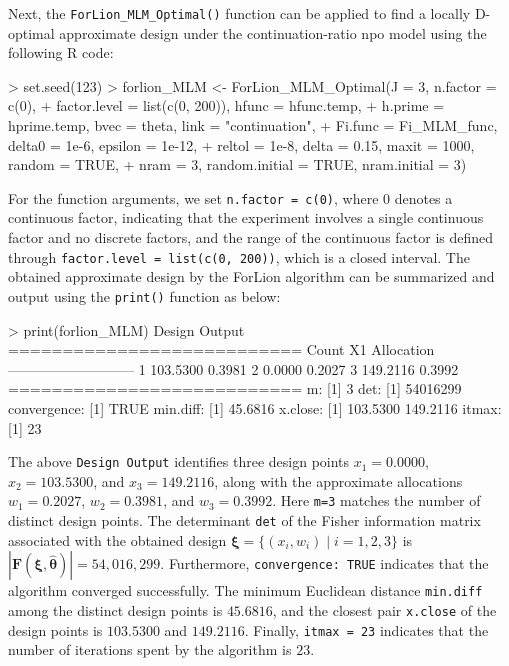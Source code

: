 Next, the \verb|ForLion_MLM_Optimal()| function can be applied to find a locally D-optimal approximate design under the continuation-ratio npo model using the following R code:
\begin{example}
> set.seed(123)
> forlion_MLM <- ForLion_MLM_Optimal(J = 3, n.factor = c(0),
+                factor.level = list(c(0, 200)), hfunc = hfunc.temp, 
+                h.prime = hprime.temp, bvec = theta, link = "continuation", 
+                Fi.func = Fi_MLM_func, delta0 = 1e-6, epsilon = 1e-12, 
+                reltol = 1e-8, delta = 0.15, maxit = 1000, random = TRUE, 
+                nram = 3, random.initial = TRUE, nram.initial = 3)
\end{example}

For the function arguments, we set \verb|n.factor = c(0)|, where 0 denotes a continuous factor, indicating that the experiment involves a single continuous factor and no discrete factors, and the range of the continuous factor is defined through \texttt{factor.level = list(c(0, 200))}, which is a closed interval. The obtained approximate design by the ForLion algorithm can be summarized and output using the \verb|print()| function as below:
\begin{example}
> print(forlion_MLM)
Design Output
=========================== 
Count  X1        Allocation
--------------------------- 
1      103.5300  0.3981
2        0.0000  0.2027
3      149.2116  0.3992
=========================== 
m:
[1] 3
det:
[1] 54016299
convergence:
[1] TRUE
min.diff:
[1] 45.6816
x.close:
[1] 103.5300 149.2116
itmax:
[1] 23
\end{example}

The above \verb|Design Output| identifies three design points $x_1 = 0.0000$, $x_2 = 103.5300$, and $x_3 = 149.2116$, along with the approximate allocations  $w_1 = 0.2027$, $w_2 = 0.3981$, and $w_3 = 0.3992$. Here \verb|m=3| matches the number of distinct design points. The determinant {\tt det} of the Fisher information matrix associated with the obtained design $\boldsymbol{\xi} = \{(x_i, w_i) \mid i=1,2,3\}$ is $\left| \mathbf F(\boldsymbol\xi, \hat{\boldsymbol{\theta}})\right|=54,016,299$. Furthermore, \verb|convergence: TRUE| indicates that the algorithm converged successfully. The minimum Euclidean distance {\tt min.diff} among the distinct design points is $45.6816$, and the closest pair {\tt x.close} of the design points is $103.5300$ and $149.2116$. Finally, \verb|itmax = 23| indicates that the number of iterations spent by the algorithm is $23$. 

